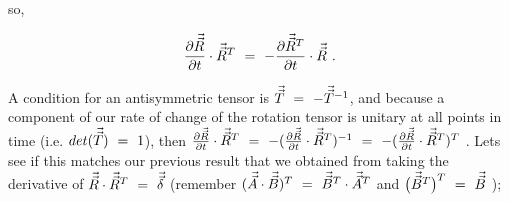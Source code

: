 \documentclass{article}
\begin{document}
so,

\begin{equation} \label{eq:1}
\frac{\partial{\vec{\vec{R}}}}{\partial{t}} \cdot  \vec{\vec{R}}^{T} \hspace{0.125cm} = \hspace{0.125cm} - \frac{\partial{\vec{\vec{R}}^{T}}}{\partial{t}} \cdot  \vec{\vec{R}}\hspace{0.125cm} . 
\end{equation}

A condition for an antisymmetric tensor is  \begin{math} \vec{\vec{T}}  \hspace{0.125cm} = \hspace{0.125cm} - \vec{\vec{T}}^{-1} \end{math}, and because a component of our rate of change of the rotation tensor is unitary at all points in time (i.e. \begin{math} det (\vec{\vec{T}} ) \hspace{0.125cm} = \hspace{0.125cm} 1 \end{math}), then \begin{math} \frac{\partial{\vec{\vec{R}}}}{\partial{t}} \cdot  \vec{\vec{R}}^{T} \hspace{0.125cm} = \hspace{0.125cm} - ( \frac{\partial{\vec{\vec{R}}}}{\partial{t}} \cdot  \vec{\vec{R}}^{T} )^{-1} \hspace{0.125cm} = \hspace{0.125cm} - ( \frac{\partial{\vec{\vec{R}}}}{\partial{t}} \cdot  \vec{\vec{R}}^{T} )^{T}  \end{math} . Lets see if this matches our previous result that we obtained from taking the derivative of \begin{math} \vec{\vec{R}} \cdot \vec{\vec{R}}^{T} \hspace{0.125cm} = \hspace{0.125cm} \vec{\vec{\delta}} \end{math} (remember \begin{math} ( \vec{\vec{A}} \cdot \vec{\vec{B}} )^{T} \hspace{0.125cm} = \hspace{0.125cm} \vec{\vec{B}}^{T} \cdot \vec{\vec{A}}^T \end{math} and \begin{math} \big( \vec{\vec{B}}^{T} \big)^{T} \hspace{0.125cm} = \hspace{0.125cm} \vec{\vec{B}} \end{math}  );
\end{document}
